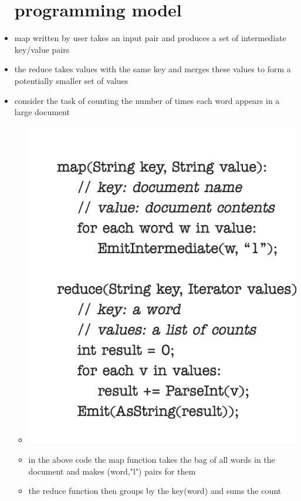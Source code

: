 \documentclass{article}
\begin{document}
\begin{itemize}
    \section*{programming model}
    \item map written by user takes an input pair and produces a set of intermediate key/value pairs 
    \item the reduce takes values with the same key and merges these values to form a potentially smaller set of values
    \item consider the task of counting the number of times each word appears in a large document 
    \begin{itemize}
        \item \includegraphics{images/Screenshot 2023-05-08 at 3.10.43 PM.png}
        \item in the above code the map function takes the bag of all words in the document and makes (word,"l") pairs for them 
        \item the reduce function then groups by the key(word) and sums the count 
    \end{itemize}

\end{itemize}
\end{document}
